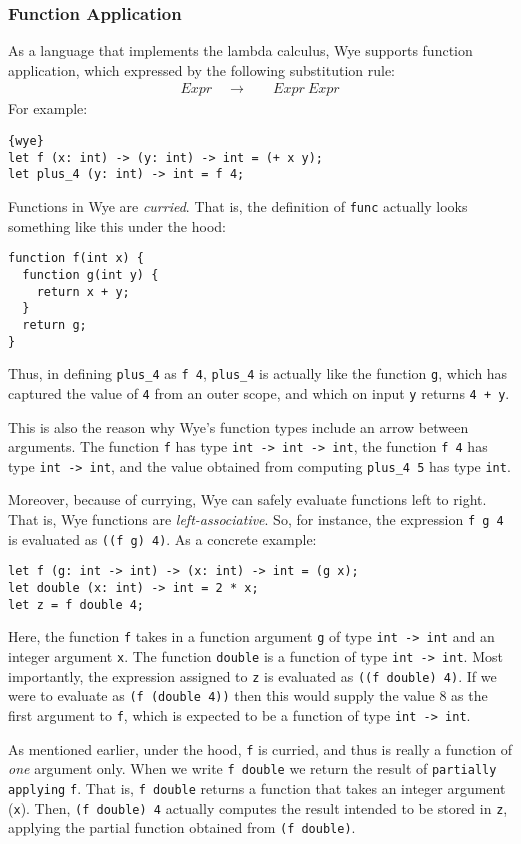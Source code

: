 \documentclass[a4paper, 12pt]{article}
\newcommand{\substo}{\quad\rightarrow\quad}
\begin{document}
\subsubsection{Function Application}
As a language that implements the lambda calculus, Wye supports function application, which expressed by the following substitution rule:
\begin{align*}
Expr\substo& Expr\: Expr
\end{align*}
For example:
\begin{lstlisting}{wye}
let f (x: int) -> (y: int) -> int = (+ x y);
let plus_4 (y: int) -> int = f 4;
\end{lstlisting}
Functions in Wye are \textit{curried}. That is, the definition of \texttt{func} actually looks something like this under the hood:
\begin{verbatim}
function f(int x) {
  function g(int y) {
    return x + y;
  }
  return g;
}
\end{verbatim}
Thus, in defining \texttt{plus\_4} as \texttt{f 4}, \texttt{plus\_4} is actually like the function \texttt{g}, which has captured the value of \texttt{4} from an outer scope, and which on input \texttt{y} returns \texttt{4 + y}.

This is also the reason why Wye's function types include an arrow between arguments. The function \texttt{f} has type \texttt{int -> int -> int}, the function \texttt{f 4} has type \texttt{int -> int}, and the value obtained from computing \texttt{plus\_4 5} has type \texttt{int}.

Moreover, because of currying, Wye can safely evaluate functions left to right. That is, Wye functions are \textit{left-associative}. So, for instance, the expression \texttt{f g 4} is evaluated as \texttt{((f g) 4)}. As a concrete example:
\begin{lstlisting}
let f (g: int -> int) -> (x: int) -> int = (g x);
let double (x: int) -> int = 2 * x;
let z = f double 4;
\end{lstlisting}
Here, the function \texttt{f} takes in a function argument \texttt{g} of type \texttt{int -> int} and an integer argument \texttt{x}. The function \texttt{double} is a function of type \texttt{int -> int}. Most importantly, the expression assigned to  \texttt{z} is evaluated as \texttt{((f double) 4)}. If we were to evaluate as \texttt{(f (double 4))} then this would supply the value 8 as the first argument to \texttt{f}, which is expected to be a function of type \texttt{int -> int}.

As mentioned earlier, under the hood, \texttt{f} is curried, and thus is really a function of \textit{one} argument only. When we write \texttt{f double} we return the result of \texttt{partially applying} \texttt{f}. That is, \texttt{f double} returns a function that takes an integer argument (\texttt{x}). Then, \texttt{(f double) 4} actually computes the result intended to be stored in \texttt{z}, applying the partial function obtained from \texttt{(f double)}.
\end{document}
